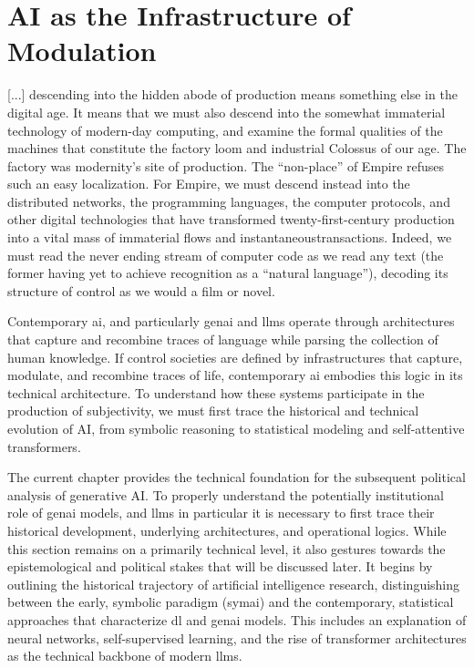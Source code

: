 \chapter{AI as the Infrastructure of Modulation}\label{cha:ai}
\glsresetall

\epigraph{[...] descending into the hidden abode of production means something else in the digital age. It means that we must also descend into the somewhat immaterial technology of modern-day computing, and examine the formal qualities of the machines that constitute the factory loom and industrial Colossus of our age. The factory was modernity’s site of production. The “non-place” of Empire refuses such an easy localization. For Empire, we must descend instead into the distributed networks, the programming languages, the computer protocols, and other digital technologies that have transformed twenty-first-century production into a vital mass of immaterial flows and instantaneoustransactions. Indeed, we must read the never ending stream of computer code as we read any text (the former having yet to achieve recognition as a “natural language”), decoding its structure of control as we would a film or novel.}{\cite[82]{galloway2001}}


\greensquare

Contemporary \gls{ai}, and particularly \gls{genai} and \glspl{llm} operate through architectures that capture and recombine traces of language while parsing the collection of human knowledge. If control societies are defined by infrastructures that capture, modulate, and recombine traces of life, contemporary \gls{ai} embodies this logic in its technical architecture. To understand how these systems participate in the production of subjectivity, we must first trace the historical and technical evolution of AI, from symbolic reasoning to statistical modeling and self-attentive transformers.

The current chapter provides the technical foundation for the subsequent political analysis of generative AI. To properly understand the potentially institutional role of \gls{genai} models, and \glspl{llm} in particular it is necessary to first trace their historical development, underlying architectures, and operational logics. While this section remains on a primarily technical level, it also gestures towards the epistemological and political stakes that will be discussed later.
It begins by outlining the historical trajectory of artificial intelligence research, distinguishing between the early, symbolic paradigm (\gls{symai}) and the contemporary, statistical approaches that characterize \gls{dl}  and \gls{genai} models. This includes an explanation of neural networks, self-supervised learning, and the rise of transformer architectures as the technical backbone of modern \glspl{llm}.

